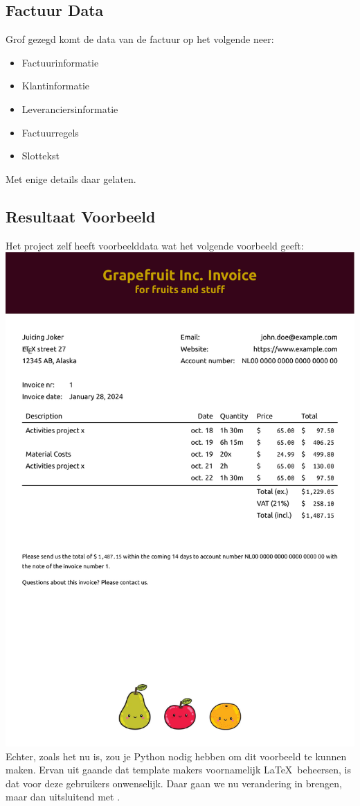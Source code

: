 \documentclass[dutch]{ltugboat}
\begin{document}
    \subsection{Factuur Data}\label{sub:invoice data}
    Grof gezegd komt de data van de factuur op het volgende neer:
    \begin{itemize}
        \item Factuurinformatie
        \item Klantinformatie
        \item Leveranciersinformatie
        \item Factuurregels
        \item Slottekst
    \end{itemize}
    Met enige details daar gelaten.

    \subsection{Resultaat Voorbeeld}
    Het project zelf heeft voorbeelddata wat het volgende voorbeeld geeft:\\
    \includegraphics[width=\linewidth]{ginvoice.pdf}
    Echter, zoals het nu is, zou je Python nodig hebben om dit voorbeeld te kunnen maken.
    Ervan uit gaande dat template makers voornamelijk \LaTeX\ beheersen, is dat voor deze gebruikers onwenselijk.
    Daar gaan we nu verandering in brengen, maar dan uitsluitend met \LuaLaTeX.
\end{document}
